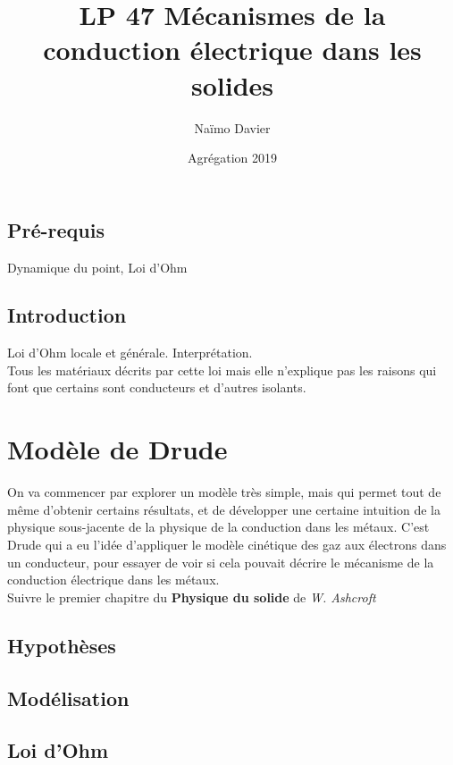 \documentclass[12pt,prb,aps,epsf]{article}
\begin{document}
	
	\title{LP 47 Mécanismes de la conduction électrique dans les solides}
	\author{Naïmo Davier}
	\date{Agrégation 2019}
	
	\maketitle
	
	\tableofcontents
	
	\pagebreak
	
	
	
\subsection{Pré-requis}
Dynamique du point, Loi d'Ohm

\subsection{Introduction}
Loi d'Ohm locale et générale. Interprétation.\\
Tous les matériaux décrits par cette loi mais elle n'explique pas les raisons qui font que certains sont conducteurs et d'autres isolants.

\section{Modèle de Drude}
On va commencer par explorer un modèle très simple, mais qui permet tout de même d'obtenir certains résultats, et de développer une certaine intuition de la physique sous-jacente de la physique de la conduction dans les métaux. C'est Drude qui a eu l'idée d'appliquer le modèle cinétique des gaz aux électrons dans un conducteur, pour essayer de voir si cela pouvait décrire le mécanisme de la conduction électrique dans les métaux.\\

Suivre le premier chapitre du \textbf{Physique du solide} de \textit{W. Ashcroft}

\subsection{Hypothèses}
\subsection{Modélisation}
\subsection{Loi d'Ohm}
\end{document}
